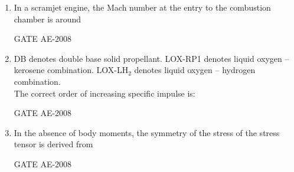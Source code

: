 \documentclass[journal,12pt,onecolumn]{IEEEtran}
\theoremstyle{remark}
\begin{document}
\begin{enumerate}
\quad 

\item In a scramjet engine, the Mach number at the entry to the combustion chamber is around \\
\begin{enumerate}
\end{enumerate}
\hfill{GATE AE-2008}

\quad 

\item DB denotes double base solid propellant.  
LOX-RP1 denotes liquid oxygen -- kerosene combination.  
LOX-LH$_2$ denotes liquid oxygen -- hydrogen combination.  \\

The correct order of increasing specific impulse is:  \\

\begin{enumerate}
\end{enumerate} 
\hfill{GATE AE-2008}

\quad 

\item  In the absence of body moments, the symmetry of the stress of the stress tensor is derived from \\
\begin{enumerate}
\end{enumerate}
\hfill{GATE AE-2008}


\end{enumerate}
\end{document}
